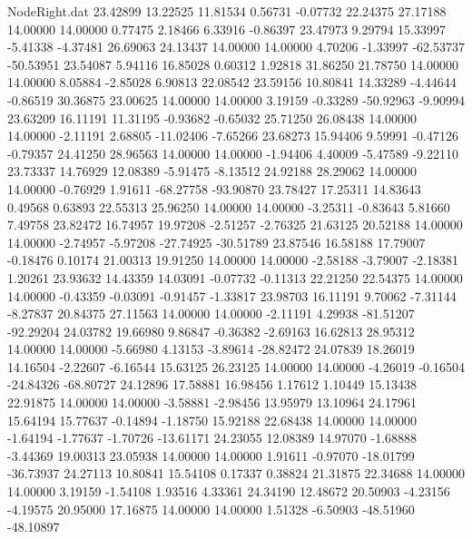 \begin{filecontents}{NodeRight.dat}
  23.42899   13.22525   11.81534     0.56731   -0.07732   22.24375   27.17188   14.00000   14.00000    0.77475    2.18466    6.33916   -0.86397
  23.47973    9.29794   15.33997    -5.41338   -4.37481   26.69063   24.13437   14.00000   14.00000    4.70206   -1.33997  -62.53737  -50.53951
  23.54087    5.94116   16.85028     0.60312    1.92818   31.86250   21.78750   14.00000   14.00000    8.05884   -2.85028    6.90813   22.08542
  23.59156   10.80841   14.33289    -4.44644   -0.86519   30.36875   23.00625   14.00000   14.00000    3.19159   -0.33289  -50.92963   -9.90994
  23.63209   16.11191   11.31195    -0.93682   -0.65032   25.71250   26.08438   14.00000   14.00000   -2.11191    2.68805  -11.02406   -7.65266
  23.68273   15.94406    9.59991    -0.47126   -0.79357   24.41250   28.96563   14.00000   14.00000   -1.94406    4.40009   -5.47589   -9.22110
  23.73337   14.76929   12.08389    -5.91475   -8.13512   24.92188   28.29062   14.00000   14.00000   -0.76929    1.91611  -68.27758  -93.90870
  23.78427   17.25311   14.83643     0.49568    0.63893   22.55313   25.96250   14.00000   14.00000   -3.25311   -0.83643    5.81660    7.49758
  23.82472   16.74957   19.97208    -2.51257   -2.76325   21.63125   20.52188   14.00000   14.00000   -2.74957   -5.97208  -27.74925  -30.51789
  23.87546   16.58188   17.79007    -0.18476    0.10174   21.00313   19.91250   14.00000   14.00000   -2.58188   -3.79007   -2.18381    1.20261
  23.93632   14.43359   14.03091    -0.07732   -0.11313   22.21250   22.54375   14.00000   14.00000   -0.43359   -0.03091   -0.91457   -1.33817
  23.98703   16.11191    9.70062    -7.31144   -8.27837   20.84375   27.11563   14.00000   14.00000   -2.11191    4.29938  -81.51207  -92.29204
  24.03782   19.66980    9.86847    -0.36382   -2.69163   16.62813   28.95312   14.00000   14.00000   -5.66980    4.13153   -3.89614  -28.82472
  24.07839   18.26019   14.16504    -2.22607   -6.16544   15.63125   26.23125   14.00000   14.00000   -4.26019   -0.16504  -24.84326  -68.80727
  24.12896   17.58881   16.98456     1.17612    1.10449   15.13438   22.91875   14.00000   14.00000   -3.58881   -2.98456   13.95979   13.10964
  24.17961   15.64194   15.77637    -0.14894   -1.18750   15.92188   22.68438   14.00000   14.00000   -1.64194   -1.77637   -1.70726  -13.61171
  24.23055   12.08389   14.97070    -1.68888   -3.44369   19.00313   23.05938   14.00000   14.00000    1.91611   -0.97070  -18.01799  -36.73937
  24.27113   10.80841   15.54108     0.17337    0.38824   21.31875   22.34688   14.00000   14.00000    3.19159   -1.54108    1.93516    4.33361
  24.34190   12.48672   20.50903    -4.23156   -4.19575   20.95000   17.16875   14.00000   14.00000    1.51328   -6.50903  -48.51960  -48.10897

\end{filecontents}
